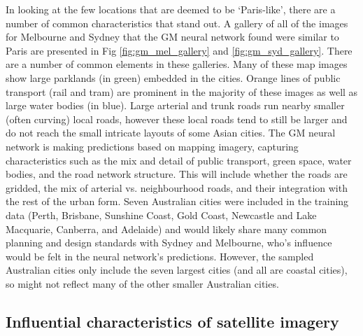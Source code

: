 \documentclass[10pt,letterpaper,hidelinks]{article}
\begin{document}
In looking at the few locations that are deemed to be `Paris-like', there are a number of common characteristics that stand out. A gallery of all of the images for Melbourne and Sydney that the GM neural network found were similar to Paris are presented in Fig \ref{fig:gm_mel_gallery} and \ref{fig:gm_syd_gallery}. There are a number of common elements in these galleries. Many of these map images show large parklands (in green) embedded in the cities. Orange lines of public transport (rail and tram) are prominent in the majority of these images as well as large water bodies (in blue). Large arterial and trunk roads run nearby smaller (often curving) local roads, however these local roads tend to still be larger and do not reach the small intricate layouts of some Asian cities. The GM neural network is making predictions based on mapping imagery, capturing characteristics such as the mix and detail of public transport, green space, water bodies, and the road network structure. This will include whether the roads are gridded, the mix of arterial vs. neighbourhood roads, and their integration with the rest of the urban form. Seven Australian cities were included in the training data (Perth, Brisbane, Sunshine Coast, Gold Coast, Newcastle and Lake Macquarie, Canberra, and Adelaide) and would likely share many common planning and design standards with Sydney and Melbourne, who's influence would be felt in the neural network's predictions. However, the sampled Australian cities only include the seven largest cities (and all are coastal cities), so might not reflect many of the other smaller Australian cities. 

\subsection*{Influential characteristics of satellite imagery}
\end{document}
